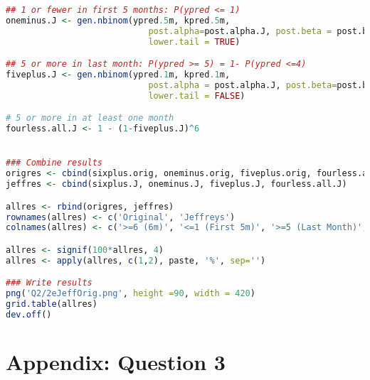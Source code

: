 \documentclass{article}
\begin{document}
\begin{lstlisting}[language=R]
## 1 or fewer in first 5 months: P(ypred <= 1)
oneminus.J <- gen.nbinom(ypred.5m, kpred.5m, 
                            post.alpha=post.alpha.J, post.beta = post.beta.J, 
                            lower.tail = TRUE)

## 5 or more in last month: P(ypred >= 5) = 1- P(ypred <=4)
fiveplus.J <- gen.nbinom(ypred.1m, kpred.1m, 
                            post.alpha = post.alpha.J, post.beta=post.beta.J, 
                            lower.tail = FALSE)

# 5 or more in at least one month
fourless.all.J <- 1 - (1-fiveplus.J)^6


### Combine results
origres <- cbind(sixplus.orig, oneminus.orig, fiveplus.orig, fourless.all.orig)
jeffres <- cbind(sixplus.J, oneminus.J, fiveplus.J, fourless.all.J)

allres <- rbind(origres, jeffres)
rownames(allres) <- c('Original', 'Jeffreys')
colnames(allres) <- c('>=6 (6m)', '<=1 (First 5m)', '>=5 (Last Month)', '>=5 (Any month)')

allres <- signif(100*allres, 4)
allres <- apply(allres, c(1,2), paste, '%', sep='')

### Write results
png('Q2/2eJeffOrig.png', height =90, width = 420)
grid.table(allres)
dev.off()
\end{lstlisting}

\newpage
\section{Appendix: Question 3} \label{appA3}
\end{document}
